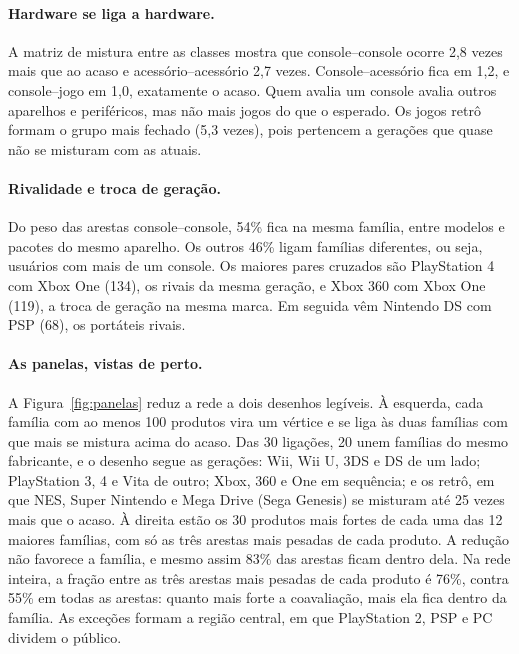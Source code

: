 \documentclass[sigconf,nonacm]{webmedia}
\begin{document}
\paragraph{Hardware se liga a hardware.}
A matriz de mistura entre as classes mostra
que console--console ocorre 2,8 vezes mais que ao acaso e
acessório--acessório 2,7 vezes. Console--acessório fica em 1,2, e
console--jogo em 1,0, exatamente o acaso. Quem avalia um console
avalia outros aparelhos e periféricos, mas não mais jogos do que o
esperado. Os jogos retrô formam o grupo mais fechado (5,3 vezes), pois
pertencem a gerações que quase não se misturam com as atuais.


\paragraph{Rivalidade e troca de geração.}
Do peso das arestas console--console, 54\% fica na mesma família,
entre modelos e pacotes do mesmo aparelho. Os outros 46\% ligam
famílias diferentes, ou seja, usuários com mais de um console. Os
maiores pares cruzados são PlayStation 4 com Xbox One (134), os rivais
da mesma geração, e Xbox 360 com Xbox One (119), a troca de geração na
mesma marca. Em seguida vêm Nintendo DS com PSP (68), os portáteis
rivais.

\paragraph{As panelas, vistas de perto.}
A Figura~\ref{fig:panelas} reduz a rede a dois desenhos legíveis. À
esquerda, cada família com ao menos 100 produtos vira um vértice e se
liga às duas famílias com que mais se mistura acima do acaso. Das 30
ligações, 20 unem famílias do mesmo fabricante, e o desenho segue as
gerações: Wii, Wii U, 3DS e DS de um lado; PlayStation 3, 4 e Vita de
outro; Xbox, 360 e One em sequência; e os retrô, em que NES, Super
Nintendo e Mega Drive (Sega Genesis) se misturam até 25 vezes mais que
o acaso. À direita estão os 30 produtos mais fortes de cada uma das
12 maiores famílias, com só as três arestas mais pesadas de cada
produto. A redução não favorece a família, e mesmo assim 83\% das
arestas ficam dentro dela. Na rede inteira, a fração entre as três
arestas mais pesadas de cada produto é 76\%, contra 55\% em todas as
arestas: quanto mais forte a coavaliação, mais ela fica dentro da
família. As exceções formam a região central, em que PlayStation 2,
PSP e PC dividem o público.
\end{document}
